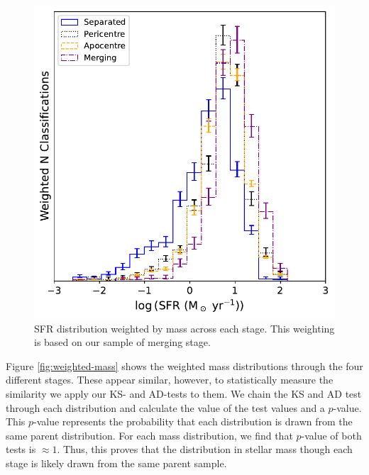 \begin{figure}
\centering
\includegraphics[width=\textwidth]{Chapter3/figures/sfr_dist.pdf}
\caption[SFR distribution weighted by mass across each stage.]{SFR distribution weighted by mass across each stage. This weighting is based on our sample of merging stage.}
\label{fig:weighted-sfr}
\end{figure}

Figure \ref{fig:weighted-mass} shows the weighted mass distributions through the four different stages. These appear similar, however, to statistically measure the similarity we apply our KS- and AD-tests to them. We chain the KS and AD test through each distribution and calculate the value of the test values and a $p$-value. This $p$-value represents the probability that each distribution is drawn from the same parent distribution. For each mass distribution, we find that $p$-value of both tests is $\approx1$. Thus, this proves that the distribution in stellar mass though each stage is likely drawn from the same parent sample. 

